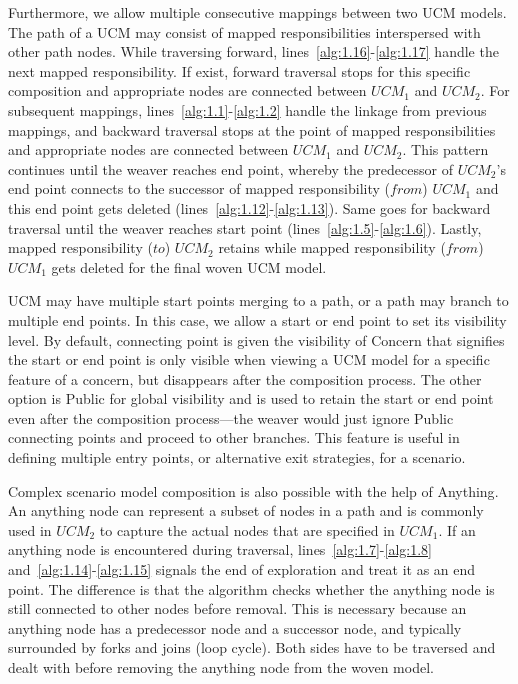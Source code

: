 Furthermore, we allow multiple consecutive mappings between two UCM models. The path of a UCM may consist of mapped responsibilities interspersed with other path nodes. While traversing forward, lines~\ref{alg:1.16}-\ref{alg:1.17} handle the next mapped responsibility. If exist, forward traversal stops for this specific composition and appropriate nodes are connected between $UCM_1$ and $UCM_2$. For subsequent mappings, lines~\ref{alg:1.1}-\ref{alg:1.2} handle the linkage from previous mappings, and backward traversal stops at the point of mapped responsibilities and appropriate nodes are connected between $UCM_1$ and $UCM_2$. This pattern continues until the weaver reaches end point, whereby the predecessor of $UCM_2$'s end point connects to the successor of mapped responsibility ($from$) $UCM_1$ and this end point gets deleted (lines~\ref{alg:1.12}-\ref{alg:1.13}). Same goes for backward traversal until the weaver reaches start point (lines~\ref{alg:1.5}-\ref{alg:1.6}). Lastly, mapped responsibility ($to$) $UCM_2$ retains while mapped responsibility ($from$) $UCM_1$ gets deleted for the final woven UCM model.

UCM may have multiple start points merging to a path, or a path may branch to multiple end points. In this case, we allow a start or end point to set its visibility level. By default, connecting point is given the visibility of {\cls Concern} that signifies the start or end point is only visible when viewing a UCM model for a specific feature of a concern, but disappears after the composition process. The other option is {\cls Public} for global visibility and is used to retain the start or end point even after the composition process---the weaver would just ignore {\cls Public} connecting points and proceed to other branches. This feature is useful in defining multiple entry points, or alternative exit strategies, for a scenario.

Complex scenario model composition is also possible with the help of {\cls Anything}. An anything node can represent a subset of nodes in a path and is commonly used in $UCM_2$ to capture the actual nodes that are specified in $UCM_1$. If an anything node is encountered during traversal, lines~\ref{alg:1.7}-\ref{alg:1.8} and~\ref{alg:1.14}-\ref{alg:1.15} signals the end of exploration and treat it as an end point. The difference is that the algorithm checks whether the anything node is still connected to other nodes before removal. This is necessary because an anything node has a predecessor node and a successor node, and typically surrounded by forks and joins (loop cycle). Both sides have to be traversed and dealt with before removing the anything node from the woven model.

